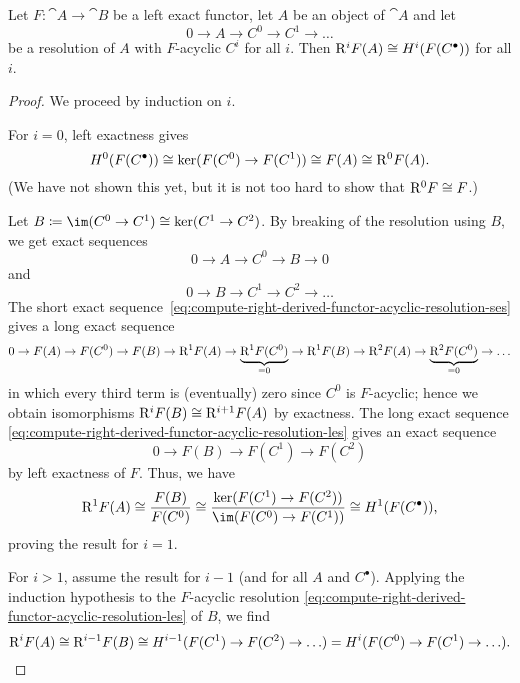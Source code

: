 \begin{lem}\label{lem:compute-right-derived-functor-acyclic-resolution}
Let \(F\colon\cat A\to\cat B\) be a left exact functor, let \(A\) be an object of \(\cat A\) and let
\[0\to A\to C^0\to C^1\to\ldots\]
be a resolution of \(A\) with \(F\)-acyclic \(C^i\) for all \(i\).
Then \(\mathrm{R}^iF(A)\cong H^i(F(C^\bullet))\) for all \(i\).
\end{lem}
\begin{proof}
We proceed by induction on \(i\).

For \(i=0\), left exactness gives
\[ H^0(F(C^\bullet)) \cong \ker(F(C^0)\to F(C^1)) \cong F(A) \cong \mathrm{R}^0F(A)\text{.} \]
(We have not shown this yet, but it is not too hard to show that \(\mathrm{R}^0F\cong F\).)

Let \(B\coloneq\im(C^0\to C^1)\cong\ker(C^1\to C^2)\).
By breaking of the resolution using \(B\), we get exact sequences
\begin{equation}
  \label{eq:compute-right-derived-functor-acyclic-resolution-ses}
  0\to A\to C^0\to B\to 0 
\end{equation}
and
\begin{equation}
  \label{eq:compute-right-derived-functor-acyclic-resolution-les}
  0\to B\to C^1\to C^2\to \ldots
\end{equation}
The short exact sequence~\cref{eq:compute-right-derived-functor-acyclic-resolution-ses} gives a long exact sequence
\[ 0\to F(A)\to F(C^0)\to F(B)\to \mathrm{R}^1F(A)\to \underbrace{\mathrm{R}^1F(C^0)}_{=0}\to \mathrm{R}^1F(B)\to \mathrm{R}^2F(A)\to \underbrace{\mathrm{R}^2F(C^0)}_{=0}\to \ldots \]
in which every third term is (eventually) zero since \(C^0\) is \(F\)-acyclic; hence we obtain isomorphisms \(\mathrm{R}^iF(B)\cong \mathrm{R}^{i+1}F(A)\) by exactness.
The long exact sequence \cref{eq:compute-right-derived-functor-acyclic-resolution-les} gives an exact sequence
\[ 0\to F(B)\to F(C^1)\to F(C^2) \]
by left exactness of \(F\).
Thus, we have
\[ \rightderived^1F(A) \cong \frac{F(B)}{F(C^0)} \cong \frac{\ker(F(C^1)\to F(C^2))}{\im(F(C^0)\to F(C^1))} \cong H^1(F(C^\bullet))\text{,} \]
proving the result for \(i=1\).

For \(i>1\), assume the result for \(i-1\) (and for all \(A\) and \(C^\bullet\)).
Applying the induction hypothesis to the \(F\)-acyclic resolution \cref{eq:compute-right-derived-functor-acyclic-resolution-les} of \(B\), we find
\[ \mathrm{R}^iF(A) \cong \mathrm{R}^{i-1}F(B) \cong H^{i-1}(F(C^1)\to F(C^2)\to\ldots) = H^i(F(C^0)\to F(C^1)\to\ldots)\text{.} \qedhere \]
\end{proof}


